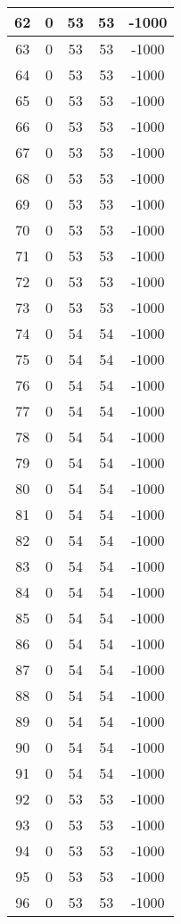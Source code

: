 \documentclass[letterpaper, 12pt]{article}
\begin{document}
\begin{longtable}{|c|c|c|c|c|}
\hline
62 & 0 & 53 & 53 & -1000 \\
\hline
63 & 0 & 53 & 53 & -1000 \\
\hline
64 & 0 & 53 & 53 & -1000 \\
\hline
65 & 0 & 53 & 53 & -1000 \\
\hline
66 & 0 & 53 & 53 & -1000 \\
\hline
67 & 0 & 53 & 53 & -1000 \\
\hline
68 & 0 & 53 & 53 & -1000 \\
\hline
69 & 0 & 53 & 53 & -1000 \\
\hline
70 & 0 & 53 & 53 & -1000 \\
\hline
71 & 0 & 53 & 53 & -1000 \\
\hline
72 & 0 & 53 & 53 & -1000 \\
\hline
73 & 0 & 53 & 53 & -1000 \\
\hline
74 & 0 & 54 & 54 & -1000 \\
\hline
75 & 0 & 54 & 54 & -1000 \\
\hline
76 & 0 & 54 & 54 & -1000 \\
\hline
77 & 0 & 54 & 54 & -1000 \\
\hline
78 & 0 & 54 & 54 & -1000 \\
\hline
79 & 0 & 54 & 54 & -1000 \\
\hline
80 & 0 & 54 & 54 & -1000 \\
\hline
81 & 0 & 54 & 54 & -1000 \\
\hline
82 & 0 & 54 & 54 & -1000 \\
\hline
83 & 0 & 54 & 54 & -1000 \\
\hline
84 & 0 & 54 & 54 & -1000 \\
\hline
85 & 0 & 54 & 54 & -1000 \\
\hline
86 & 0 & 54 & 54 & -1000 \\
\hline
87 & 0 & 54 & 54 & -1000 \\
\hline
88 & 0 & 54 & 54 & -1000 \\
\hline
89 & 0 & 54 & 54 & -1000 \\
\hline
90 & 0 & 54 & 54 & -1000 \\
\hline
91 & 0 & 54 & 54 & -1000 \\
\hline
92 & 0 & 53 & 53 & -1000 \\
\hline
93 & 0 & 53 & 53 & -1000 \\
\hline
94 & 0 & 53 & 53 & -1000 \\
\hline
95 & 0 & 53 & 53 & -1000 \\
\hline
96 & 0 & 53 & 53 & -1000 \\

\end{longtable}
\end{document}
